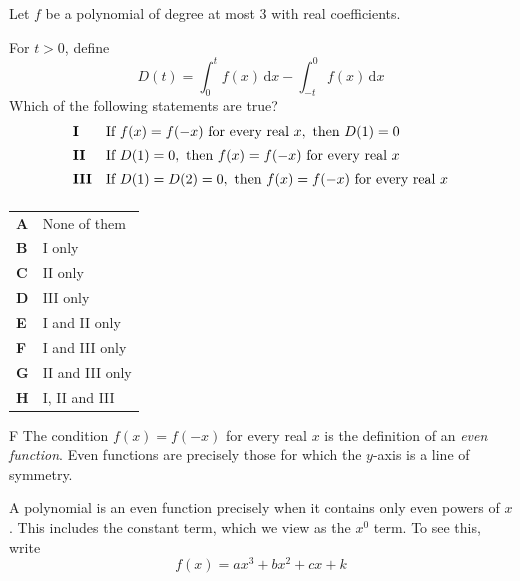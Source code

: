\documentclass[11pt,a4paper]{article}
\begin{document}
\begin{enumerate}[label=\textbf{\arabic*.},leftmargin=*,itemsep=0pt,start=20]
\questionitem[Integration]
Let $f$ be a polynomial of degree at most $3$ with real coefficients.

For $t>0$, define
\[
D(t)=\int_0^t f(x)\,\mathrm{d}x-\int_{-t}^0 f(x)\,\mathrm{d}x
\]
Which of the following statements are true?
\[
\begin{array}{@{}ll@{}}
\textbf{I} & \text{If }f(x)=f(-x)\text{ for every real }x,\text{ then }D(1)=0 \\[5pt]
\textbf{II} & \text{If }D(1)=0,\text{ then }f(x)=f(-x)\text{ for every real }x \\[5pt]
\textbf{III} & \text{If }D(1)=D(2)=0,\text{ then }f(x)=f(-x)\text{ for every real }x \\[5pt]
\end{array}
\]

\par\vspace*{12pt}
\begin{tabularx}{\linewidth}{@{}>{\bfseries}l Y@{}}
A &
None of them
\\[0.8em]
B &
I only
\\[0.8em]
C &
II only
\\[0.8em]
D &
III only
\\[0.8em]
E &
I and II only
\\[0.8em]
F &
I and III only
\\[0.8em]
G &
II and III only
\\[0.8em]
H &
I, II and III
\\
\end{tabularx}

\begin{djsSolution}{F}
The condition $f(x)=f(-x)$ for every real $x$ is the definition of an \emph{even function}. Even functions are precisely those for which the $y$-axis is a line of symmetry.

A polynomial is an even function precisely when it contains only even powers of $x$. This includes the constant term, which we view as the $x^0$ term. To see this, write
\[
f(x)=ax^3+bx^2+cx+k
\]


\end{djsSolution}
\end{enumerate}
\end{document}

